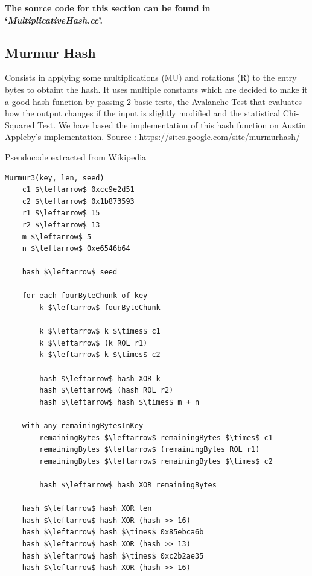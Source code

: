 \documentclass[12pt]{article}
\begin{document}
{\begin{lstlisting}[mathescape=true]
\end{lstlisting}

\textbf{The source code for this section can be found in `\textit{MultiplicativeHash.cc}'.}
\bigskip



\subsection{Murmur Hash}

Consists in applying some multiplications (MU) and rotations (R) to the entry bytes to obtaint the hash. It uses multiple constants which are decided to make it a good hash function by passing 2 basic tests, the Avalanche Test that evaluates how the output changes if the input is slightly modified and the statistical Chi-Squared Test. We have based the implementation of this hash function on Austin Appleby's implementation. Source : \url{https://sites.google.com/site/murmurhash/}\\
\medskip
\begin{center}
\begin{large}
Pseudocode extracted from Wikipedia
\end{large}
\end{center}

\begin{lstlisting}[mathescape=true]
Murmur3(key, len, seed)
    c1 $\leftarrow$ 0xcc9e2d51
    c2 $\leftarrow$ 0x1b873593
    r1 $\leftarrow$ 15
    r2 $\leftarrow$ 13
    m $\leftarrow$ 5
    n $\leftarrow$ 0xe6546b64
 
    hash $\leftarrow$ seed

    for each fourByteChunk of key
        k $\leftarrow$ fourByteChunk

        k $\leftarrow$ k $\times$ c1
        k $\leftarrow$ (k ROL r1)
        k $\leftarrow$ k $\times$ c2

        hash $\leftarrow$ hash XOR k
        hash $\leftarrow$ (hash ROL r2)
        hash $\leftarrow$ hash $\times$ m + n

    with any remainingBytesInKey
        remainingBytes $\leftarrow$ remainingBytes $\times$ c1
        remainingBytes $\leftarrow$ (remainingBytes ROL r1)
        remainingBytes $\leftarrow$ remainingBytes $\times$ c2

        hash $\leftarrow$ hash XOR remainingBytes
 
    hash $\leftarrow$ hash XOR len
    hash $\leftarrow$ hash XOR (hash >> 16)
    hash $\leftarrow$ hash $\times$ 0x85ebca6b
    hash $\leftarrow$ hash XOR (hash >> 13)
    hash $\leftarrow$ hash $\times$ 0xc2b2ae35
    hash $\leftarrow$ hash XOR (hash >> 16)


\end{lstlisting}}
\end{document}
